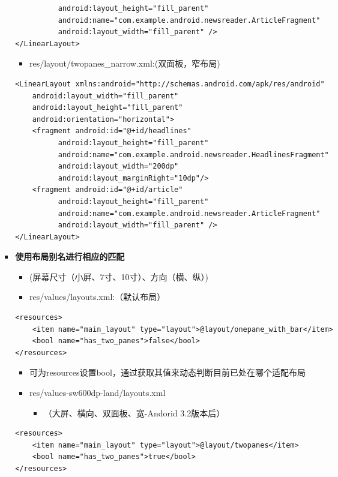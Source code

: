\documentclass[9pt, b5paper]{article}
\begin{document}
\begin{enumerate}
\begin{enumerate}
\begin{enumerate}
\begin{itemize}
\begin{verbatim}
          android:layout_height="fill_parent"
          android:name="com.example.android.newsreader.ArticleFragment"
          android:layout_width="fill_parent" />
</LinearLayout>
\end{verbatim}
\begin{itemize}
\item res/layout/twopanes\_narrow.xml:(双面板，窄布局)
\end{itemize}
\begin{verbatim}
<LinearLayout xmlns:android="http://schemas.android.com/apk/res/android"
    android:layout_width="fill_parent"
    android:layout_height="fill_parent"
    android:orientation="horizontal">
    <fragment android:id="@+id/headlines"
          android:layout_height="fill_parent"
          android:name="com.example.android.newsreader.HeadlinesFragment"
          android:layout_width="200dp"
          android:layout_marginRight="10dp"/>
    <fragment android:id="@+id/article"
          android:layout_height="fill_parent"
          android:name="com.example.android.newsreader.ArticleFragment"
          android:layout_width="fill_parent" />
</LinearLayout>
\end{verbatim}
\item \textbf{使用布局别名进行相应的匹配}
\begin{itemize}
\item (屏幕尺寸（小屏、7寸、10寸）、方向（横、纵）)
\item res/values/layouts.xml:（默认布局）
\end{itemize}
\begin{verbatim}
<resources>  
    <item name="main_layout" type="layout">@layout/onepane_with_bar</item>  
    <bool name="has_two_panes">false</bool>  
</resources>
\end{verbatim}
\begin{itemize}
\item 可为resources设置bool，通过获取其值来动态判断目前已处在哪个适配布局
\item res/values-sw600dp-land/layouts.xml
\begin{itemize}
\item （大屏、横向、双面板、宽-Andorid 3.2版本后）
\end{itemize}
\end{itemize}
\begin{verbatim}
<resources>
    <item name="main_layout" type="layout">@layout/twopanes</item>
    <bool name="has_two_panes">true</bool>
</resources>
\end{verbatim}

\end{itemize}
\end{enumerate}
\end{enumerate}
\end{enumerate}
\end{document}
